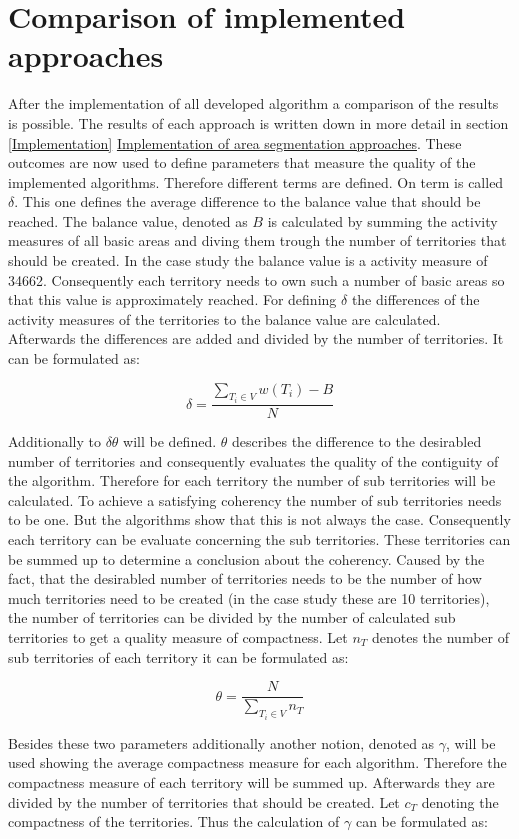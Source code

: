 \section{Comparison of implemented approaches}
After the implementation of all developed algorithm a comparison of the results is possible. The results of each approach is written down in more detail in section \ref{Implementation} \hyperref[Implementation]{Implementation of area segmentation approaches}. These outcomes are now used to define parameters that measure the quality of the implemented algorithms. Therefore different terms are defined.
On term is called $\delta$. This one defines the average difference to the balance value that should be reached. The balance value, denoted as $B$ is calculated by summing the activity measures of all basic areas and diving them trough the number of territories that should be created. In the case study the balance value is a activity measure of 34662. Consequently each territory needs to own such a number of basic areas so that this value is approximately reached. For defining $\delta$ the differences of the activity measures of the territories to the balance value are calculated. Afterwards the differences are added and divided by the number of territories. It can be formulated as:

\[ \mathit{\delta  = \frac{\sum\nolimits  _{T_{i} \in V} w(T_{i})-B}{N}}\]

Additionally to $\delta \theta $ will be defined. $\theta$ describes the difference to the desirabled number of territories and consequently evaluates the quality of the contiguity of the algorithm. Therefore for each territory the number of sub territories will be calculated. To achieve a satisfying coherency the number of sub territories needs to be one. But the algorithms show that this is not always the case. Consequently each territory can be evaluate concerning the sub territories. These territories can be summed up to determine a conclusion about the coherency. Caused by the fact, that the desirabled number of territories needs to be the number of how much territories need to be created (in the case study these are 10 territories), the number of territories can be divided by the number of calculated sub territories to get a quality measure of compactness. Let $n_{T}$ denotes the number of sub territories of each territory it can be formulated as:

\[ \mathit{\theta  = \frac{N}{\sum\nolimits  _{T_{i} \in V} n_{T}}}\]

Besides these two parameters additionally another notion, denoted as $\gamma$, will be used showing the average compactness measure for each algorithm. Therefore the compactness measure of each territory will be summed up. Afterwards they are divided by the number of territories that should be created. Let $c_{T}$ denoting the compactness of the territories. Thus the calculation of $\gamma$ can be formulated as:


